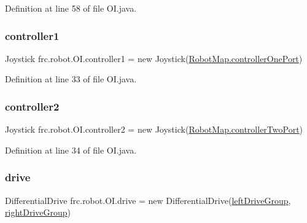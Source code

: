 Definition at line 58 of file O\+I.\+java.

\mbox{\label{classfrc_1_1robot_1_1OI_a06db411c1eebb80d10f685c57954bac9}} 
\subsubsection{\texorpdfstring{controller1}{controller1}}
{\footnotesize\ttfamily Joystick frc.\+robot.\+O\+I.\+controller1 = new Joystick(\hyperlink{classfrc_1_1robot_1_1RobotMap_adf0118e5a9de03d6f71ea1e5a6a81cc9}{Robot\+Map.\+controller\+One\+Port})\hspace{0.3cm}{\ttfamily [static]}}



Definition at line 33 of file O\+I.\+java.

\mbox{\label{classfrc_1_1robot_1_1OI_a749a3f830f90057dc4fd65e7f34a3251}} 
\subsubsection{\texorpdfstring{controller2}{controller2}}
{\footnotesize\ttfamily Joystick frc.\+robot.\+O\+I.\+controller2 = new Joystick(\hyperlink{classfrc_1_1robot_1_1RobotMap_a762ebcaa07378c37d88654506850e07f}{Robot\+Map.\+controller\+Two\+Port})\hspace{0.3cm}{\ttfamily [static]}}



Definition at line 34 of file O\+I.\+java.

\mbox{\label{classfrc_1_1robot_1_1OI_a8527ec31aa37a3ff523e5ba857aba46f}} 
\subsubsection{\texorpdfstring{drive}{drive}}
{\footnotesize\ttfamily Differential\+Drive frc.\+robot.\+O\+I.\+drive = new Differential\+Drive(\hyperlink{classfrc_1_1robot_1_1OI_a6d76241e542ab271366e4cb4bf7b5133}{left\+Drive\+Group}, \hyperlink{classfrc_1_1robot_1_1OI_a1595c2b8ebd7e4e467027b2eb21983ee}{right\+Drive\+Group})\hspace{0.3cm}{\ttfamily [static]}}



